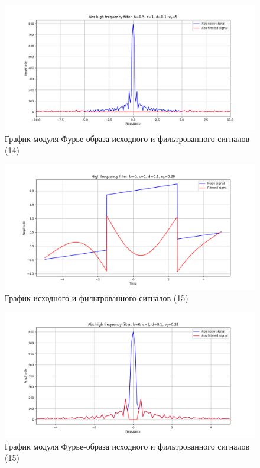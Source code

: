 \documentclass[a4paper, 12pt]{article}
\begin{document}
    \begin{figure}[!htb]
        \centering
        \includegraphics[scale=0.48]{14_abs_u_U_nolow.png}
        \captionsetup{skip=0pt}
        \caption{График модуля Фурье-образа исходного и фильтрованного сигналов (14)}
        \label{fig:fig54}
    \end{figure}
    \begin{figure}[!htb]
        \centering
        \includegraphics[scale=0.48]{15_u_flt_u_nolow.png}
        \captionsetup{skip=0pt}
        \caption{График исходного и фильтрованного сигналов (15)}
        \label{fig:fig55}
    \end{figure}
    \newpage
    \begin{figure}[!htb]
        \centering
        \includegraphics[scale=0.48]{15_abs_u_U_nolow.png}
        \captionsetup{skip=0pt}
        \caption{График модуля Фурье-образа исходного и фильтрованного сигналов (15)}
        \label{fig:fig56}
    \end{figure}
\end{document}
